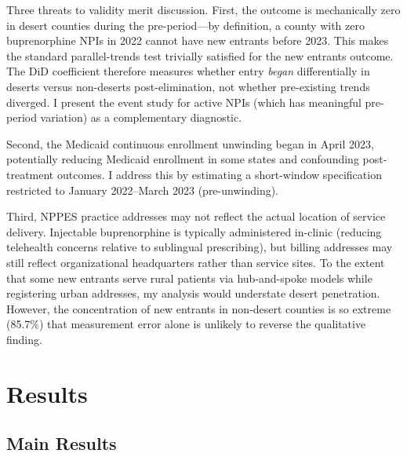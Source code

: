 \documentclass[12pt]{article}
\begin{document}
Three threats to validity merit discussion. First, the outcome is mechanically zero in desert counties during the pre-period---by definition, a county with zero buprenorphine NPIs in 2022 cannot have new entrants before 2023. This makes the standard parallel-trends test trivially satisfied for the new entrants outcome. The DiD coefficient therefore measures whether entry \textit{began} differentially in deserts versus non-deserts post-elimination, not whether pre-existing trends diverged. I present the event study for active NPIs (which has meaningful pre-period variation) as a complementary diagnostic.

Second, the Medicaid continuous enrollment unwinding began in April 2023, potentially reducing Medicaid enrollment in some states and confounding post-treatment outcomes. I address this by estimating a short-window specification restricted to January 2022--March 2023 (pre-unwinding).

Third, NPPES practice addresses may not reflect the actual location of service delivery. Injectable buprenorphine is typically administered in-clinic (reducing telehealth concerns relative to sublingual prescribing), but billing addresses may still reflect organizational headquarters rather than service sites. To the extent that some new entrants serve rural patients via hub-and-spoke models while registering urban addresses, my analysis would understate desert penetration. However, the concentration of new entrants in non-desert counties is so extreme (85.7\%) that measurement error alone is unlikely to reverse the qualitative finding.

\section{Results}

\subsection{Main Results}
\end{document}
